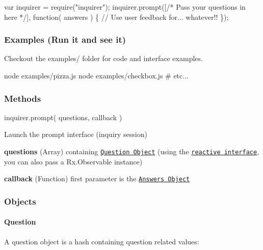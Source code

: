 \begin{DoxyCode}
var inquirer = require("inquirer");
inquirer.prompt([/* Pass your questions in here */], function( answers ) \{
    // Use user feedback for... whatever!!
\});
\end{DoxyCode}


\subsubsection*{Examples (Run it and see it)}

Checkout the {\ttfamily examples/} folder for code and interface examples.


\begin{DoxyCode}
node examples/pizza.js
node examples/checkbox.js
# etc...
\end{DoxyCode}


\subsubsection*{Methods}

{\ttfamily inquirer.\+prompt( questions, callback )}

Launch the prompt interface (inquiry session)


\begin{DoxyItemize}
\item {\bfseries questions} (Array) containing \href{#question}{\tt Question Object} (using the \href{#reactive-interface}{\tt reactive interface}, you can also pass a {\ttfamily Rx.\+Observable} instance)
\item {\bfseries callback} (Function) first parameter is the \href{#answers}{\tt Answers Object}
\end{DoxyItemize}

\subsubsection*{Objects}

\paragraph*{Question}

A question object is a {\ttfamily hash} containing question related values\+:


